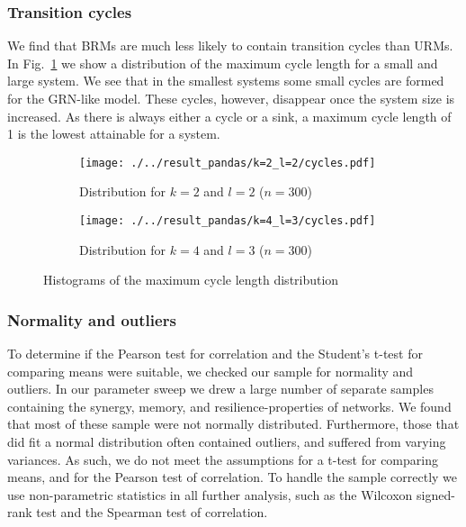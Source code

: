 \documentclass[../main.tex]{subfiles}
\begin{document}
\subsubsection{Transition cycles}

We find that BRMs are much less likely to contain transition cycles than URMs.
In Fig.~\ref{fig:cycles} we show a distribution of the maximum cycle length for a small and large system.
We see that in the smallest systems some small cycles are formed for the GRN-like model.
These cycles, however, disappear once the system size is increased.
As there is always either a cycle or a sink, a maximum cycle length of 1 is the lowest attainable for a system.

\begin{figure}[H]
    \centering
    \begin{subfigure}[b]{0.48\textwidth}
        \texttt{[image: ./../result\_pandas/k=2\_l=2/cycles.pdf]}
        \caption{Distribution for $k=2$ and $l=2$ ($n=300$)}
    \end{subfigure}
    \begin{subfigure}[b]{0.48\textwidth}
        \texttt{[image: ./../result\_pandas/k=4\_l=3/cycles.pdf]}
        \caption{Distribution for $k=4$ and $l=3$ ($n=300$)}
    \end{subfigure}
    \caption{Histograms of the maximum cycle length distribution}
    \label{fig:cycles}
\end{figure}


\subsubsection{Normality and outliers}

To determine if the Pearson test for correlation and the Student's t-test for comparing means were suitable, we checked our sample for normality and outliers.
In our parameter sweep we drew a large number of separate samples containing the synergy, memory, and resilience-properties of networks.
We found that most of these sample were not normally distributed.
Furthermore, those that did fit a normal distribution often contained outliers, and suffered from varying variances.
As such, we do not meet the assumptions for a t-test for comparing means, and for the Pearson test of correlation.
To handle the sample correctly we use non-parametric statistics in all further analysis, such as the Wilcoxon signed-rank test and the Spearman test of correlation. %
\end{document}
